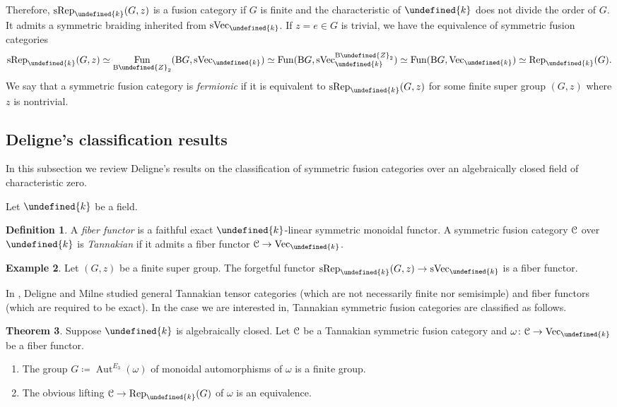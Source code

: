 \documentclass[10pt]{article}
\let\mathbb\undefined
\theoremstyle{definition}
\newtheorem{thm}{Theorem}[section]
\newtheorem{defn}[thm]{Definition}
\newtheorem{expl}[thm]{Example}
\numberwithin{equation}{section}
\numberwithin{thm}{section}
\newcommand{\bnu}{\begin{enumerate}}
\newcommand{\enu}{\end{enumerate}}
\newcommand{\Zb}{\mathbb{Z}}
\newcommand{\bk}{\mathbb{k}}
\newcommand{\CC}{\EuScript{C}}
\newcommand{\rmB}{\mathrm{B}}
\DeclareMathOperator{\Aut}{Aut}
\DeclareMathOperator{\fun}{Fun}
\newcommand{\vect}{\mathrm{Vec}}
\newcommand{\svect}{\mathrm{sVec}}
\newcommand{\rep}{\mathrm{Rep}}
\newcommand{\srep}{\mathrm{sRep}}
\begin{document}
Therefore, $\srep_\bk(G,z)$ is a fusion category if $G$ is finite and the characteristic of $\bk$ does not divide the order of $G$. It admits a symmetric braiding inherited from $\svect_\bk$. If $z = e \in G$ is trivial, we have the equivalence of symmetric fusion categories
\[
\srep_\bk(G,z) \simeq \fun_{\rmB \Zb_2}(\rmB G,\svect_\bk) \simeq \fun(\rmB G,\svect_\bk^{\rmB \Zb_2}) \simeq \fun(\rmB G,\vect_\bk) \simeq \rep_\bk(G) .
\]
We say that a symmetric fusion category is \emph{fermionic} if it is equivalent to $\srep_\bk(G,z)$ for some finite super group $(G,z)$ where $z$ is nontrivial.

\subsection{Deligne's classification results}

In this subsection we review Deligne's results on the classification of symmetric fusion categories over an algebraically closed field of characteristic zero.

Let $\bk$ be a field.

\begin{defn}
A \emph{fiber functor} is a faithful exact $\bk$-linear symmetric monoidal functor. A symmetric fusion category $\CC$ over $\bk$ is \emph{Tannakian} if it admits a fiber functor $\CC \to \vect_\bk$.
\end{defn}

\begin{expl}
Let $(G,z)$ be a finite super group. The forgetful functor $\srep_\bk(G,z) \to \svect_\bk$ is a fiber functor.
\end{expl}

In \cite{DM82}, Deligne and Milne studied general Tannakian tensor categories (which are not necessarily finite nor semisimple) and fiber functors (which are required to be exact). In the case we are interested in, Tannakian symmetric fusion categories are classified as follows.

\begin{thm}
Suppose $\bk$ is algebraically closed. Let $\CC$ be a Tannakian symmetric fusion category and $\omega \colon \CC \to \vect_\bk$ be a fiber functor.
\bnu[(1)]
\item The group $G \coloneqq \Aut^{E_3}(\omega)$ of monoidal automorphisms of $\omega$ is a finite group.
\item The obvious lifting $\CC \to \rep_\bk(G)$ of $\omega$ is an equivalence.
\enu
\end{thm}
\end{document}
